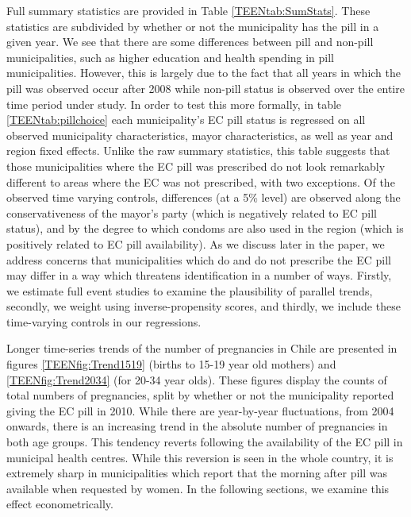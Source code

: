 Full summary statistics are provided in Table \ref{TEENtab:SumStats}.  These
statistics are subdivided by whether or not the municipality has the pill in
a given year.  We see that there are some differences between pill and non-pill
municipalities, such as higher education and health spending in pill 
municipalities.  However, this is largely due to the fact that all years in which
the pill was observed occur after 2008 while non-pill status is observed over
the entire time period under study.  In order to test this more formally, in
table \ref{TEENtab:pillchoice} each municipality's EC pill status is regressed
on all observed municipality characteristics, mayor characteristics, as well as 
year and region fixed effects.  Unlike the raw summary statistics, this table 
suggests that those municipalities where the EC pill was prescribed do not look
remarkably different to areas where the EC was not prescribed, with two 
exceptions.  Of the observed time varying controls, differences (at a 5\% level)
are observed along the conservativeness of the mayor's party (which is negatively 
related to EC pill status), and by the degree to which condoms are also used in 
the region (which is positively related to EC pill availability).  As we discuss 
later in the paper, we address concerns that municipalities which do and do not 
prescribe the EC pill may differ in a way which threatens identification in a 
number of ways.  Firstly, we estimate full event studies to examine the 
plausibility of parallel trends, secondly, we weight using inverse-propensity 
scores, and thirdly, we include these time-varying controls in our regressions.

Longer time-series trends of the number of pregnancies in Chile are presented
in figures \ref{TEENfig:Trend1519} (births to 15-19 year old mothers) and 
\ref{TEENfig:Trend2034} (for 20-34 year olds).  These figures display the counts 
of total numbers of pregnancies, split by whether or not the municipality 
reported giving the EC pill in 2010.  While there are year-by-year fluctuations, 
from 2004 onwards, there is an increasing trend in the absolute number of 
pregnancies in both age groups.  This tendency reverts following the availability 
of the EC pill in municipal health centres.  While this reversion is seen in the 
whole country, it is extremely sharp in municipalities which report that the 
morning after pill was available when requested by women.  In the following 
sections, we examine this effect econometrically.

